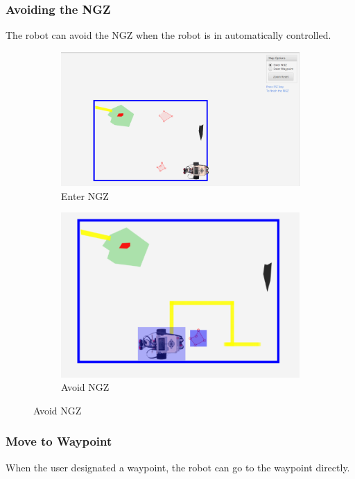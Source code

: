 \documentclass[10pt,a4paper,titlepage]{article}
\begin{document}
  \subsubsection{Avoiding the NGZ} 
The robot can avoid the NGZ when the robot is in automatically controlled. 

\begin{figure}[H]
	\centering
	\begin{subfigure}[t]{0.45\textwidth}
		\includegraphics[width=0.95\linewidth]{enterngz.png}  
  \caption{Enter NGZ} 
\label{fig:Enter NGZ}                
	\end{subfigure}
	\begin{subfigure}[t]{0.45\textwidth}
		\includegraphics[width=0.95\linewidth]{avoidngz.png}  
  \caption{Avoid NGZ} 
\label{fig:Avoid NGZ}               
	\end{subfigure}
\end{figure}

   
  \subsubsection{  Move to Waypoint} 
When the user designated a waypoint, the robot can go to the waypoint directly.  
   
\end{document}
